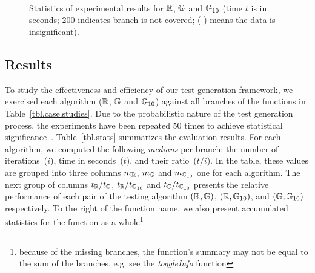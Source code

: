 \begin{figure*}[!t]
\centering
\begin{minipage}[c]{.43\linewidth}
\centering
{}\\
\\
\\
\begin{minipage}[c]{.6\linewidth}
\subfloat[Time $t$]{
  \centering
  
  \label{fig.gen.time.comp}
}
\end{minipage}
\hfill
\begin{minipage}[c]{.3\linewidth}
\subfloat[Speed $t/i$]{
  \centering
  
  \label{fig.get.cost}
}
\end{minipage}
\end{minipage}
\hfill
\begin{minipage}[c]{.55\linewidth}
\end{minipage}
\caption{Statistics of experimental results for $\mathbb{R}$, $\mathbb{G}$ and $\mathbb{G}_{10}$ (time $t$ is in seconds; \underline{200} indicates branch is not covered; (-) means the data is insignificant).}
\label{lab3}
\end{figure*}


\subsection{Results}
\label{sub.sec.eval.results}

To study the effectiveness and efficiency of our test generation framework, we exercised each algorithm ($\mathbb{R}$, $\mathbb{G}$ and $\mathbb{G}_{10}$) against all branches of the functions in Table~\ref{tbl.case.studies}. Due to the probabilistic nature of the test generation process, the experiments have been repeated 50 times to achieve statistical significance~\cite{arcuri2011practical}. Table~\ref{tbl.stats} summarizes the evaluation results. For each algorithm, we computed the following \emph{medians} per branch: the number of iterations~($i$), time in seconds~($t$), and their ratio~($t/i$). In the table, these values are grouped into three columns $m_{\mathbb{R}}$, $m_{\mathbb{G}}$ and $m_{\mathbb{G}_{10}}$ one for each algorithm. The next group of columns $t_{\mathbb{R}}/t_{\mathbb{G}}$, $t_{\mathbb{R}}/t_{\mathbb{G}_{10}}$ and $t_{\mathbb{G}}/t_{\mathbb{G}_{10}}$ presents the relative performance of each pair of the testing algorithm $(\mathbb{R},\mathbb{G})$, $(\mathbb{R},\mathbb{G}_{10})$, and $(\mathbb{G},\mathbb{G}_{10})$ respectively. To the right of the function name, we also present accumulated statistics for the function as a whole\footnote{because of the missing branches, the function's summary may not be equal to the sum of the branches, e.g. see the \emph{toggleInfo} function}

